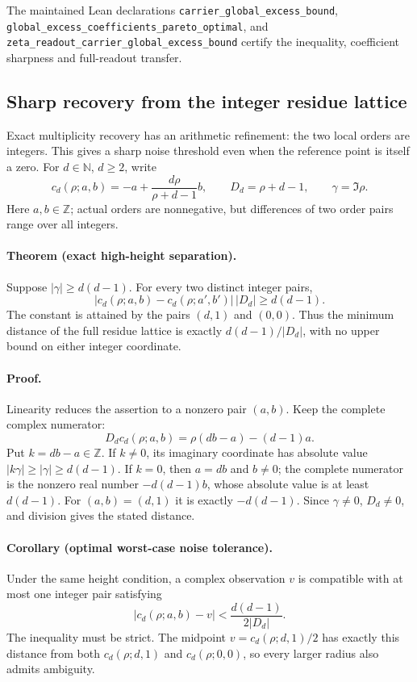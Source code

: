 The maintained Lean declarations
\texttt{carrier\_global\_excess\_bound},
\texttt{global\_excess\_coefficients\_pareto\_optimal},
and \texttt{zeta\_readout\_carrier\_global\_excess\_bound}
certify the inequality, coefficient sharpness and full-readout
transfer.

\subsection{Sharp recovery from the integer residue lattice}
\label{sec:integer-residue-decoding}

Exact multiplicity recovery has an arithmetic refinement: the two local
orders are integers. This gives a sharp noise threshold even when the
reference point is itself a zero. For \(d\in\mathbb N\), \(d\ge2\), write
\[
 c_d(\rho;a,b)=-a+\frac{d\rho}{\rho+d-1}b,\qquad
 D_d=\rho+d-1,\qquad \gamma=\Im\rho.
\]
Here \(a,b\in\mathbb Z\); actual orders are nonnegative, but differences of
two order pairs range over all integers.

\paragraph{Theorem (exact high-height separation).}
\label{thm:integer-residue-separation}
Suppose \(|\gamma|\ge d(d-1)\). For every two distinct integer pairs,
\[
 |c_d(\rho;a,b)-c_d(\rho;a',b')|\,|D_d|\ge d(d-1).
\]
The constant is attained by the pairs \((d,1)\) and \((0,0)\).
Thus the minimum distance of the full residue lattice is exactly
\(d(d-1)/|D_d|\), with no upper bound on either integer coordinate.
\paragraph{Proof.}
Linearity reduces the assertion to a nonzero pair \((a,b)\). Keep the
complete complex numerator:
\[
 D_dc_d(\rho;a,b)=\rho(db-a)-(d-1)a.
\]
Put \(k=db-a\in\mathbb Z\). If \(k\ne0\), its imaginary coordinate has
absolute value \(|k\gamma|\ge|\gamma|\ge d(d-1)\). If \(k=0\), then
\(a=db\) and \(b\ne0\); the complete numerator is the nonzero real number
\(-d(d-1)b\), whose absolute value is at least \(d(d-1)\).
For \((a,b)=(d,1)\) it is exactly \(-d(d-1)\). Since \(\gamma\ne0\),
\(D_d\ne0\), and division gives the stated distance.

\paragraph{Corollary (optimal worst-case noise tolerance).}
\label{cor:integer-residue-noise}
Under the same height condition, a complex observation \(v\) is compatible
with at most one integer pair satisfying
\[
 |c_d(\rho;a,b)-v|<\frac{d(d-1)}{2|D_d|}.
\]
The inequality must be strict. The midpoint
\(v=c_d(\rho;d,1)/2\) has exactly this distance from both
\(c_d(\rho;d,1)\) and \(c_d(\rho;0,0)\), so every larger radius also
admits ambiguity.
